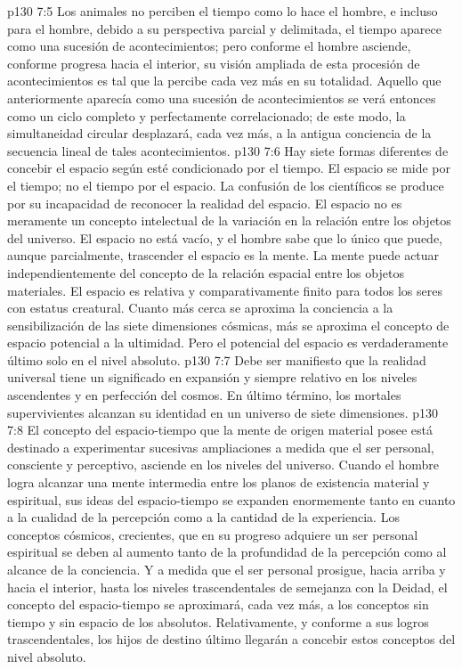 \vs p130 7:5 Los animales no perciben el tiempo como lo hace el hombre, e incluso para el hombre, debido a su perspectiva parcial y delimitada, el tiempo aparece como una sucesión de acontecimientos; pero conforme el hombre asciende, conforme progresa hacia el interior, su visión ampliada de esta procesión de acontecimientos es tal que la percibe cada vez más en su totalidad. Aquello que anteriormente aparecía como una sucesión de acontecimientos se verá entonces como un ciclo completo y perfectamente correlacionado; de este modo, la simultaneidad circular desplazará, cada vez más, a la antigua conciencia de la secuencia lineal de tales acontecimientos.
\vs p130 7:6 Hay siete formas diferentes de concebir el espacio según esté condicionado por el tiempo. El espacio se mide por el tiempo; no el tiempo por el espacio. La confusión de los científicos se produce por su incapacidad de reconocer la realidad del espacio. El espacio no es meramente un concepto intelectual de la variación en la relación entre los objetos del universo. El espacio no está vacío, y el hombre sabe que lo único que puede, aunque parcialmente, trascender el espacio es la mente. La mente puede actuar independientemente del concepto de la relación espacial entre los objetos materiales. El espacio es relativa y comparativamente finito para todos los seres con estatus creatural. Cuanto más cerca se aproxima la conciencia a la sensibilización de las siete dimensiones cósmicas, más se aproxima el concepto de espacio potencial a la ultimidad. Pero el potencial del espacio es verdaderamente último solo en el nivel absoluto.
\vs p130 7:7 Debe ser manifiesto que la realidad universal tiene un significado en expansión y siempre relativo en los niveles ascendentes y en perfección del cosmos. En último término, los mortales supervivientes alcanzan su identidad en un universo de siete dimensiones.
\vs p130 7:8 \pc El concepto del espacio\hyp{}tiempo que la mente de origen material posee está destinado a experimentar sucesivas ampliaciones a medida que el ser personal, consciente y perceptivo, asciende en los niveles del universo. Cuando el hombre logra alcanzar una mente intermedia entre los planos de existencia material y espiritual, sus ideas del espacio\hyp{}tiempo se expanden enormemente tanto en cuanto a la cualidad de la percepción como a la cantidad de la experiencia. Los conceptos cósmicos, crecientes, que en su progreso adquiere un ser personal espiritual se deben al aumento tanto de la profundidad de la percepción como al alcance de la conciencia. Y a medida que el ser personal prosigue, hacia arriba y hacia el interior, hasta los niveles trascendentales de semejanza con la Deidad, el concepto del espacio\hyp{}tiempo se aproximará, cada vez más, a los conceptos sin tiempo y sin espacio de los absolutos. Relativamente, y conforme a sus logros trascendentales, los hijos de destino último llegarán a concebir estos conceptos del nivel absoluto.
